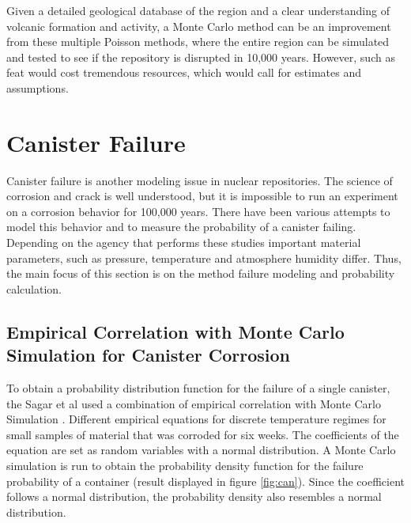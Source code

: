 \documentclass[12pt]{article}
\begin{document}
Given a detailed geological database of the region and a clear understanding
of volcanic formation and activity, a Monte Carlo method can be an 
improvement from these multiple Poisson methods, where the entire
region can be simulated and tested to see if the repository is disrupted
in 10,000 years. However, such as feat would cost tremendous resources,
which would call for estimates and assumptions.  



\section{Canister Failure}
Canister failure is another modeling issue in nuclear repositories.
The science of corrosion and crack is well understood, but it is impossible
to run an experiment on a corrosion behavior for 100,000 years.
There have been various attempts to model this behavior and to measure
the probability of a canister failing. Depending on the
agency that performs these studies important material parameters, such
as pressure, temperature and atmosphere humidity differ. Thus, the main focus
of this section is on the method failure modeling and probability calculation.

\subsection{Empirical Correlation with Monte Carlo Simulation for Canister Corrosion}
To obtain a probability distribution function for the failure of a single
canister, the Sagar et al used a combination of empirical correlation
with Monte Carlo Simulation \cite{sagar_probabilistic_1986}.
Different empirical equations for discrete temperature regimes for 
small samples of material that was corroded for six weeks. The coefficients
of the equation are set as random variables with a normal distribution.
A Monte Carlo simulation is run to obtain the probability density
function for the failure probability of a container (result displayed in
figure \ref{fig:can}). Since the coefficient follows a normal distribution,
the probability density also resembles a normal distribution.
\end{document}

